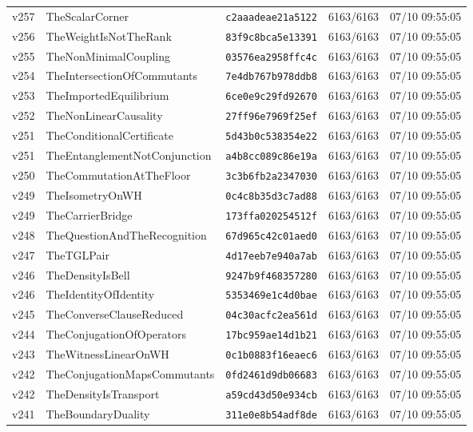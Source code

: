 \documentclass[11pt]{article}
\theoremstyle{definition}\newtheorem{deriv}{Derivação}
\begin{document}
{\begin{longtable}{@{}lllll@{}}
v257 & TheScalarCorner & \texttt{c2aaadeae21a5122} & 6163/6163 & 07/10 09:55:05 \\
v256 & TheWeightIsNotTheRank & \texttt{83f9c8bca5e13391} & 6163/6163 & 07/10 09:55:05 \\
v255 & TheNonMinimalCoupling & \texttt{03576ea2958ffc4c} & 6163/6163 & 07/10 09:55:05 \\
v254 & TheIntersectionOfCommutants & \texttt{7e4db767b978ddb8} & 6163/6163 & 07/10 09:55:05 \\
v253 & TheImportedEquilibrium & \texttt{6ce0e9c29fd92670} & 6163/6163 & 07/10 09:55:05 \\
v252 & TheNonLinearCausality & \texttt{27ff96e7969f25ef} & 6163/6163 & 07/10 09:55:05 \\
v251 & TheConditionalCertificate & \texttt{5d43b0c538354e22} & 6163/6163 & 07/10 09:55:05 \\
v251 & TheEntanglementNotConjunction & \texttt{a4b8cc089c86e19a} & 6163/6163 & 07/10 09:55:05 \\
v250 & TheCommutationAtTheFloor & \texttt{3c3b6fb2a2347030} & 6163/6163 & 07/10 09:55:05 \\
v249 & TheIsometryOnWH & \texttt{0c4c8b35d3c7ad88} & 6163/6163 & 07/10 09:55:05 \\
v249 & TheCarrierBridge & \texttt{173ffa020254512f} & 6163/6163 & 07/10 09:55:05 \\
v248 & TheQuestionAndTheRecognition & \texttt{67d965c42c01aed0} & 6163/6163 & 07/10 09:55:05 \\
v247 & TheTGLPair & \texttt{4d17eeb7e940a7ab} & 6163/6163 & 07/10 09:55:05 \\
v246 & TheDensityIsBell & \texttt{9247b9f468357280} & 6163/6163 & 07/10 09:55:05 \\
v246 & TheIdentityOfIdentity & \texttt{5353469e1c4d0bae} & 6163/6163 & 07/10 09:55:05 \\
v245 & TheConverseClauseReduced & \texttt{04c30acfc2ea561d} & 6163/6163 & 07/10 09:55:05 \\
v244 & TheConjugationOfOperators & \texttt{17bc959ae14d1b21} & 6163/6163 & 07/10 09:55:05 \\
v243 & TheWitnessLinearOnWH & \texttt{0c1b0883f16eaec6} & 6163/6163 & 07/10 09:55:05 \\
v242 & TheConjugationMapsCommutants & \texttt{0fd2461d9db06683} & 6163/6163 & 07/10 09:55:05 \\
v242 & TheDensityIsTransport & \texttt{a59cd43d50e934cb} & 6163/6163 & 07/10 09:55:05 \\
v241 & TheBoundaryDuality & \texttt{311e0e8b54adf8de} & 6163/6163 & 07/10 09:55:05 \\

\end{longtable}}
\end{document}

